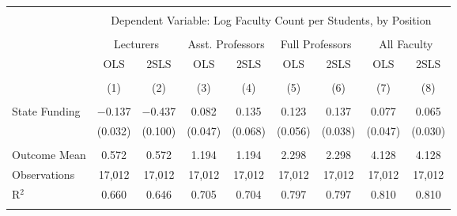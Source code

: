 
\begin{tabular}{@{\extracolsep{5pt}}lcccccccc} 
\\[-1.8ex]\hline 
\hline \\[-1.8ex] 
 & \multicolumn{8}{c}{Dependent Variable: Log Faculty Count per Students, by Position} \\ 
\cline{2-9} 
\\[-1.8ex] & \multicolumn{2}{c}{Lecturers} & \multicolumn{2}{c}{Asst. Professors} & \multicolumn{2}{c}{Full Professors} & \multicolumn{2}{c}{All Faculty} \\ 
 & OLS & 2SLS & OLS & 2SLS & OLS & 2SLS & OLS & 2SLS \\ 
\\[-1.8ex] & (1) & (2) & (3) & (4) & (5) & (6) & (7) & (8)\\ 
\hline \\[-1.8ex] 
 State Funding & $-$0.137 & $-$0.437 & 0.082 & 0.135 & 0.123 & 0.137 & 0.077 & 0.065 \\ 
  & (0.032) & (0.100) & (0.047) & (0.068) & (0.056) & (0.038) & (0.047) & (0.030) \\ 
 \hline \\[-1.8ex] 
Outcome Mean & 0.572 & 0.572 & 1.194 & 1.194 & 2.298 & 2.298 & 4.128 & 4.128 \\ 
Observations & 17,012 & 17,012 & 17,012 & 17,012 & 17,012 & 17,012 & 17,012 & 17,012 \\ 
R$^{2}$ & 0.660 & 0.646 & 0.705 & 0.704 & 0.797 & 0.797 & 0.810 & 0.810 \\ 
\hline 
\hline \\[-1.8ex] 
\end{tabular} 
